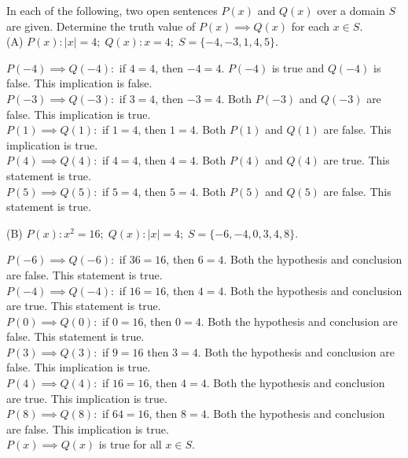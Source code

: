 \documentclass[12pt]{article}
\newenvironment{problem}[2][Problem]{\begin{trivlist}
		\item[\hskip \labelsep {\bfseries #1}\hskip \labelsep {\bfseries #2.}]}{\end{trivlist}}
\newenvironment{solution}[2][Solution]{\begin{trivlist}
		\item[\hskip \labelsep {\bfseries #1}\hskip \labelsep {\bfseries #2.}]}{\end{trivlist}}
\begin{document}
\begin{problem}{31}
	In each of the following, two open sentences $P(x)$ and $Q(x)$ over a domain $S$ are given. Determine the truth value of $P(x) \implies Q(x)$ for each $x \in S$.\\
	
	(A) $P(x): \vert{x}\vert = 4; \; Q(x):x=4; \; S= \{-4, -3, 1, 4, 5\}.$
	\begin{solution}{a}
		$P(-4) \implies Q(-4) :$ if $4 = 4$, then $-4 = 4$. $P(-4)$ is true and $Q(-4)$ is false. This implication is false.\\
		$P(-3) \implies Q(-3):$ if $3 = 4$, then $-3 = 4$. Both $P(-3)$ and $Q(-3)$ are false. This implication is true.\\
		$P(1) \implies Q(1):$ if $1 = 4$, then $1 = 4$. Both $P(1)$ and $Q(1)$ are false. This implication is true.\\
		$P(4) \implies Q(4):$ if $4 = 4$, then $4 = 4$. Both $P(4)$ and $Q(4)$ are true. This statement is true. \\
		$P(5) \implies Q(5):$ if $5 = 4$, then $5 = 4$. Both $P(5)$ and $Q(5)$ are false. This statement is true.\\
	\end{solution}
	
	(B) $P(x): x^{2} = 16; \; Q(x):\vert{x}\vert = 4; \; S=\{-6, -4, 0, 3, 4, 8\}.$
	\begin{solution}{b}
		$P(-6) \implies Q(-6):$ if $36 = 16$, then $6 = 4$. Both the hypothesis and conclusion are false. This statement is true.\\
		$P(-4) \implies Q(-4):$ if $16 = 16$, then $4 = 4$. Both the hypothesis and conclusion are true. This statement is true.\\
		$P(0) \implies Q(0):$ if $0 = 16$, then $0 = 4$. Both the hypothesis and conclusion are false. This statement is true.\\
		$P(3) \implies Q(3):$ if $9 = 16$ then $3 = 4$. Both the hypothesis and conclusion are false. This implication is true.\\
		$P(4) \implies Q(4):$ if $16 = 16$, then $4 = 4$. Both the hypothesis and conclusion are true. This implication is true.\\
		$P(8) \implies Q(8):$ if $64 = 16$, then $8 = 4$. Both the hypothesis and conclusion are false. This implication is true.\\
		$P(x) \implies Q(x)$ is true for all $x \in S$.\\
	\end{solution}


\end{problem}
\end{document}
